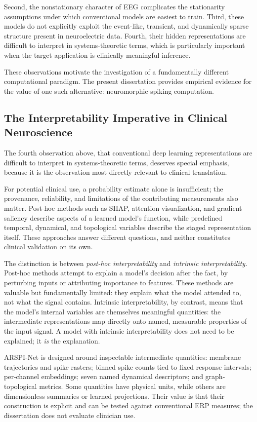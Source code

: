 Second, the nonstationary character of EEG complicates the stationarity assumptions under which conventional models are easiest to train. Third, these models do not explicitly exploit the event-like, transient, and dynamically sparse structure present in neuroelectric data. Fourth, their hidden representations are difficult to interpret in systems-theoretic terms, which is particularly important when the target application is clinically meaningful inference.

These observations motivate the investigation of a fundamentally different computational paradigm. The present dissertation provides empirical evidence for the value of one such alternative: neuromorphic spiking computation.

\subsection{The Interpretability Imperative in Clinical Neuroscience}

The fourth observation above, that conventional deep learning representations are difficult to interpret in systems-theoretic terms, deserves special emphasis, because it is the observation most directly relevant to clinical translation.

For potential clinical use, a probability estimate alone is insufficient; the provenance, reliability, and limitations of the contributing measurements also matter. Post-hoc methods such as SHAP, attention visualization, and gradient saliency describe aspects of a learned model's function, while predefined temporal, dynamical, and topological variables describe the staged representation itself. These approaches answer different questions, and neither constitutes clinical validation on its own.

The distinction is between \emph{post-hoc interpretability} and \emph{intrinsic interpretability}. Post-hoc methods attempt to explain a model's decision after the fact, by perturbing inputs or attributing importance to features. These methods are valuable but fundamentally limited: they explain what the model attended to, not what the signal contains. Intrinsic interpretability, by contrast, means that the model's internal variables are themselves meaningful quantities: the intermediate representations map directly onto named, measurable properties of the input signal. A model with intrinsic interpretability does not need to be explained; it \emph{is} the explanation.

ARSPI-Net is designed around inspectable intermediate quantities: membrane trajectories and spike rasters; binned spike counts tied to fixed response intervals; per-channel embeddings; seven named dynamical descriptors; and graph-topological metrics. Some quantities have physical units, while others are dimensionless summaries or learned projections. Their value is that their construction is explicit and can be tested against conventional ERP measures; the dissertation does not evaluate clinician use.

